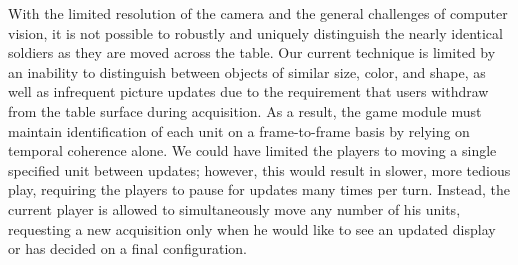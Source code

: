 \documentclass[review]{vgtc}                 %
\begin{document}


With the limited resolution of the camera and the general challenges
of computer vision, it is not possible to robustly and uniquely
distinguish the nearly identical soldiers as they are moved across the
table.  Our current technique is limited by an inability to
distinguish between objects of similar size, color, and shape, as well
as infrequent picture updates due to the requirement that users
withdraw from the table surface during acquisition.  As a result, the
game module must maintain identification of each unit on a
frame-to-frame basis by relying on temporal coherence alone.
%
We could have
limited the players to moving a single specified unit between updates;
however, this would result in slower, more tedious play, requiring the
players to pause for updates many times per turn.  Instead, the
current player is allowed to simultaneously move any number of his
units, requesting a new acquisition only when he would like to see an
updated display or has decided on a final configuration.
\end{document}

